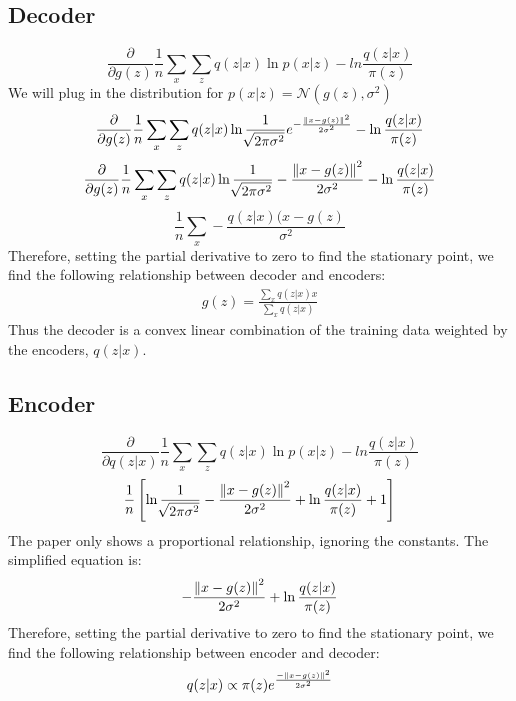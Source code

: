 \subsection*{Decoder}
\begin{equation}
\frac{\partial}{\partial g(z)}\frac{1}{n}\sum_{x}\sum_{z} q(z|x) \ln{p(x|z)} - ln \frac{q(z|x)}{\pi(z)}
\end{equation}
We will plug in the distribution for $p(x|z) = \mathcal{N}(g(z), \sigma^2)$
\begin{equation}
\frac{\partial}{\partial g(z)}\frac{1}{n}\sum_{x}\sum_{z} q(z|x) \ln{\frac{1}{\sqrt[]{2\pi\sigma^2}}}e^{-\frac{\left\lVert x-g(z)\right\rVert^2}{2\sigma^2}} - \ln\frac{q(z|x)}{\pi(z)}
\end{equation}
\begin{equation}
\frac{\partial}{\partial g(z)}\frac{1}{n}\sum_{x}\sum_{z} q(z|x) \ln{\frac{1}{\sqrt[]{2\pi\sigma^2}}}-\frac{\left\lVert x-g(z)\right\rVert^2}{2\sigma^2} - \ln\frac{q(z|x)}{\pi(z)}
\end{equation}
\begin{equation}
\frac{1}{n}\sum_{x}-\frac{q(z|x)(x-g(z)}{\sigma^2}
\end{equation}
Therefore, setting the partial derivative to zero to find the stationary point, we find the following relationship between decoder and encoders:
\begin{gather*}
g(z) = \frac{\sum_{x}{q(z|x) x}}{\sum_{x}{q(z|x)}}
\end{gather*}
Thus the decoder is a convex linear combination of the training data weighted by the encoders, $q(z|x)$.
\par

\subsection*{Encoder}
\setcounter{equation}{0}
\begin{equation}
\frac{\partial}{\partial q(z|x)}\frac{1}{n}\sum_{x}\sum_{z} q(z|x) \ln{p(x|z)} - ln \frac{q(z|x)}{\pi(z)}
\end{equation}
\begin{equation}
\frac{1}{n}\left[{\ln{\frac{1}{\sqrt[]{2\pi\sigma^2}}}-\frac{\left\lVert x-g(z)\right\rVert^2}{2\sigma^2} + \ln{\frac{q(z|x)}{\pi(z)} + 1}}\right]
\end{equation}
The paper only shows a proportional relationship, ignoring the constants. The simplified equation is:
\begin{equation}
-\frac{\left\lVert x-g(z)\right\rVert^2}{2\sigma^2} + \ln{\frac{q(z|x)}{\pi(z)}}
\end{equation}
Therefore, setting the partial derivative to zero to find the stationary point, we find the following relationship between encoder and decoder:
\begin{gather*}
q(z|x) \propto \pi(z)e^\frac{-\left\lVert x-g(z)\right\rVert^2}{2\sigma^2}
\end{gather*}

